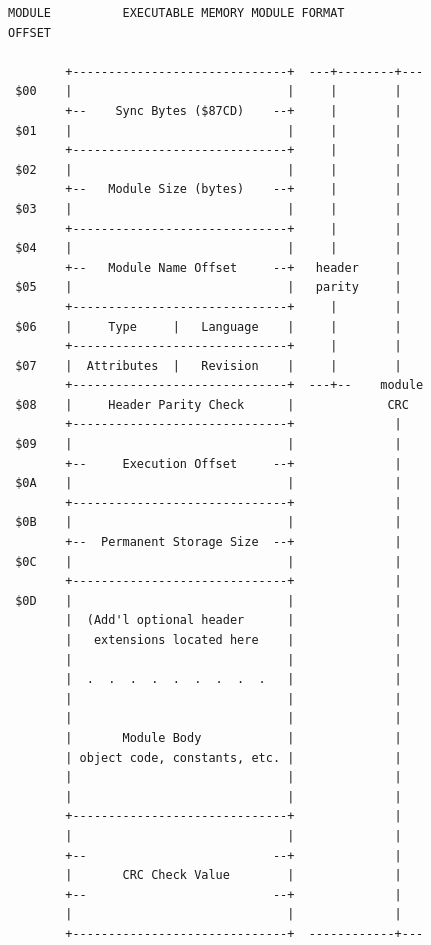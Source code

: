 \documentclass[
]{article}
\begin{document}
\begin{figure}
\centering
\begin{verbatim}
MODULE          EXECUTABLE MEMORY MODULE FORMAT
OFFSET

        +------------------------------+  ---+--------+---
 $00    |                              |     |        |
        +--    Sync Bytes ($87CD)    --+     |        |
 $01    |                              |     |        |
        +------------------------------+     |        |
 $02    |                              |     |        |
        +--   Module Size (bytes)    --+     |        |
 $03    |                              |     |        |
        +------------------------------+     |        |
 $04    |                              |     |        |
        +--   Module Name Offset     --+   header     |
 $05    |                              |   parity     |
        +------------------------------+     |        |
 $06    |     Type     |   Language    |     |        |
        +------------------------------+     |        |
 $07    |  Attributes  |   Revision    |     |        |
        +------------------------------+  ---+--    module
 $08    |     Header Parity Check      |             CRC
        +------------------------------+              |
 $09    |                              |              |
        +--     Execution Offset     --+              |
 $0A    |                              |              |
        +------------------------------+              |
 $0B    |                              |              |
        +--  Permanent Storage Size  --+              |
 $0C    |                              |              |
        +------------------------------+              |
 $0D    |                              |              |
        |  (Add'l optional header      |              |
        |   extensions located here    |              |
        |                              |              |
        |  .  .  .  .  .  .  .  .  .   |              |
        |                              |              |
        |                              |              |
        |       Module Body            |              |
        | object code, constants, etc. |              |
        |                              |              |
        |                              |              |
        +------------------------------+              |
        |                              |              |
        +--                          --+              |
        |       CRC Check Value        |              |
        +--                          --+              |
        |                              |              |
        +------------------------------+  ------------+---
\end{verbatim}
\caption{}
\end{figure}
\end{document}
